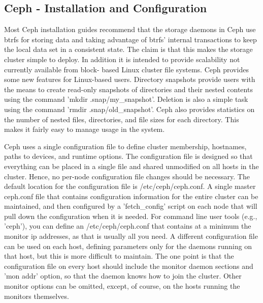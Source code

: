 \documentclass[11pt]{article}
\begin{document}
\subsection{Ceph - Installation and Configuration}
Most Ceph installation guides recommend that the storage daemons in Ceph 
use btrfs for storing data and taking advantage of btrfs' internal 
transactions to keep the local data set in a consistent state. The claim 
is that this makes the storage cluster simple to deploy. In addition it 
is intended to provide scalability not currently available from block-
based Linux cluster file systems. Ceph provides some new features for 
Linux-based users. Directory snapshots provide users with the means to 
create read-only snapshots of directories and their nested contents using 
the command 'mkdir .snap/my\_snapshot'.  Deletion is also a simple task 
using the command 'rmdir .snap/old\_snapshot'.  Ceph also provides 
statistics on the number of nested files, directories, and file sizes 
for each directory. This makes it fairly easy to manage usage in the 
system.

Ceph uses a single configuration file to define cluster membership, 
hostnames, paths to devices, and runtime options. The configuration 
file is designed so that everything can be placed in a single file and 
shared unmodified on all hosts in the cluster. Hence, no per-node 
configuration file changes should be necessary. The default location 
for the configuration file is /etc/ceph/ceph.conf. A single master 
ceph.conf file that contains configuration information for the entire 
cluster can be maintained, and then configured by  a 'fetch\_config' 
script on each node that will pull down the configuration when it is 
needed. For command line user tools (e.g., 'ceph'), you can define an 
/etc/ceph/ceph.conf that contains at a minimum the monitor ip addresses, 
as that is usually all you need. A different configuration file can be 
used on each host, defining parameters only for the daemons running on 
that host, but this is more difficult to maintain. The one point is that 
the configuration file on every host should include the monitor daemon 
sections and 'mon addr' option, so that the daemon knows how to join the 
cluster. Other monitor options can be omitted, except, of course, on the 
hosts running the monitors themselves.
\end{document}
